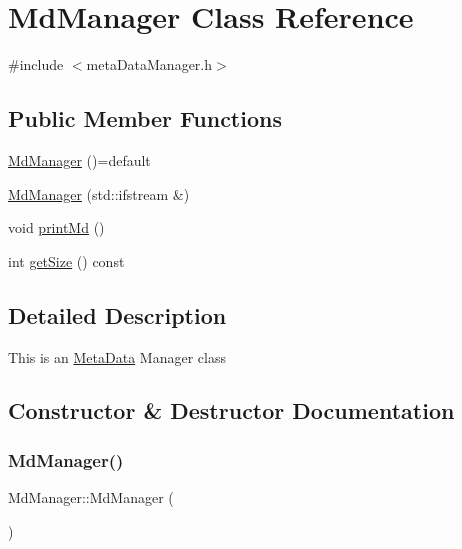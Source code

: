 \hypertarget{classMdManager}{}\section{Md\+Manager Class Reference}
\label{classMdManager}


{\ttfamily \#include $<$meta\+Data\+Manager.\+h$>$}

\subsection*{Public Member Functions}
\begin{DoxyCompactItemize}
\item 
\hyperlink{classMdManager_a540aeeb85ad958cfbf074316c44d874d}{Md\+Manager} ()=default
\item 
\hyperlink{classMdManager_a9a04c96ea303f2e8d18275ba75af2551}{Md\+Manager} (std\+::ifstream \&)
\item 
void \hyperlink{classMdManager_af9a631c2934e89728ae34be82f78e7fe}{print\+Md} ()
\item 
int \hyperlink{classMdManager_a45e38a55df629208bb6727e10de5ca2c}{get\+Size} () const
\end{DoxyCompactItemize}


\subsection{Detailed Description}
This is an \hyperlink{classMetaData}{Meta\+Data} Manager class 

\subsection{Constructor \& Destructor Documentation}
\mbox{\label{classMdManager_a540aeeb85ad958cfbf074316c44d874d}} 
\subsubsection{\texorpdfstring{Md\+Manager()}{MdManager()}\hspace{0.1cm}{\footnotesize\ttfamily [1/2]}}
{\footnotesize\ttfamily Md\+Manager\+::\+Md\+Manager (\begin{DoxyParamCaption}{ }\end{DoxyParamCaption})\hspace{0.3cm}{\ttfamily [default]}}

